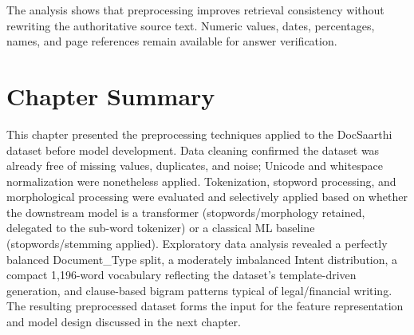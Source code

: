 The analysis shows that preprocessing improves retrieval consistency without rewriting the authoritative source text. Numeric values, dates, percentages, names, and page references remain available for answer verification.


\section*{Chapter Summary}

This chapter presented the preprocessing techniques applied to the DocSaarthi dataset before model development. Data cleaning confirmed the dataset was already free of missing values, duplicates, and noise; Unicode and whitespace normalization were nonetheless applied. Tokenization, stopword processing, and morphological processing were evaluated and selectively applied based on whether the downstream model is a transformer (stopwords/morphology retained, delegated to the sub-word tokenizer) or a classical ML baseline (stopwords/stemming applied). Exploratory data analysis revealed a perfectly balanced Document\_Type split, a moderately imbalanced Intent distribution, a compact 1,196-word vocabulary reflecting the dataset's template-driven generation, and clause-based bigram patterns typical of legal/financial writing. The resulting preprocessed dataset forms the input for the feature representation and model design discussed in the next chapter.
